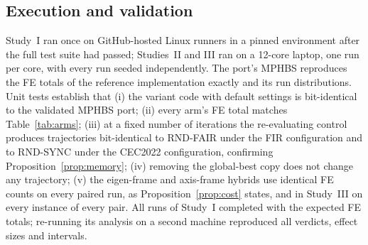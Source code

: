 \subsection{Execution and validation}
\label{sec:execution}
Study~I ran once on GitHub-hosted Linux runners in a pinned environment after the full test suite had passed; Studies~II and
III ran on a 12-core laptop, one run per core, with every run seeded independently. The port's MPHBS reproduces the FE totals of the
reference implementation exactly and its run distributions. Unit tests establish that (i) the variant code with default settings is bit-identical to
the validated MPHBS port; (ii) every arm's FE total matches Table~\ref{tab:arms}; (iii) at a fixed number of iterations the
re-evaluating control produces trajectories bit-identical to RND-FAIR under the FIR configuration and to RND-SYNC under the
CEC2022 configuration, confirming Proposition~\ref{prop:memory}; (iv) removing the global-best copy does not change any
trajectory; (v) the eigen-frame and axis-frame hybrids use identical FE counts on every paired run, as
Proposition~\ref{prop:cost} states, and in Study~III on every instance of every pair. All runs of Study~I completed with the
expected FE totals; re-running its analysis on a second machine reproduced all verdicts, effect sizes and intervals.
